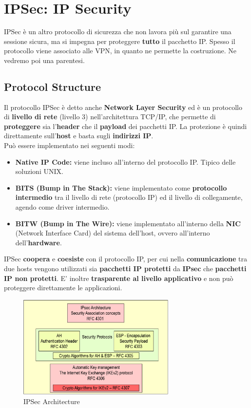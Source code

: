 \chapter{IPSec: IP Security}
IPSec è un altro protocollo di sicurezza che non lavora più sul garantire una sessione sicura, ma si impegna per proteggere \textbf{tutto} il pacchetto IP. Spesso il protocollo viene associato alle VPN, in quanto ne permette la costruzione. Ne vedremo poi una parentesi.
\section{Protocol Structure}
Il protocollo IPSec è detto anche \textbf{Network Layer Security} ed è un protocollo di \textbf{livello di rete} (livello 3) nell'architettura TCP/IP, che permette di \textbf{proteggere} sia l'\textbf{header} che il \textbf{payload} dei pacchetti IP. La protezione è quindi direttamente sull'\textbf{host} e basta sugli \textbf{indirizzi IP}.\\
Può essere implementato nei seguenti modi:
\begin{theorem}
\noindent\begin{itemize}
    \item \textbf{Native IP Code:}  viene incluso all'interno del protocollo IP. Tipico delle soluzioni UNIX.
    \item \textbf{BITS (Bump in The Stack):} viene implementato come \textbf{protocollo intermedio} tra il livello di rete (protocollo IP) ed il livello di collegamente, agendo come driver intermedio.
    \item \textbf{BITW (Bump in The Wire):} viene implementato all'interno della \textbf{NIC} (Network Interface Card) del sistema dell'host, ovvero all'interno dell'\textbf{hardware}.
\end{itemize}
\end{theorem}
\begin{remark}
IPSec \textbf{coopera} e \textbf{coesiste} con il protocollo IP, per cui nella \textbf{comunicazione} tra due hosts vengono utilizzati sia \textbf{pacchetti IP protetti} da \textbf{IPsec} che \textbf{pacchetti IP non protetti}. E' inoltre \textbf{trasparente al livello applicativo} e non può proteggere direttamente le applicazioni.
\end{remark}
\begin{figure}[h]
    \centering
    \includegraphics[width=0.7\textwidth]{image/ipsec.png}
    \caption{IPSec Architecture}
    \label{fig:ipsecarc}
\end{figure}
